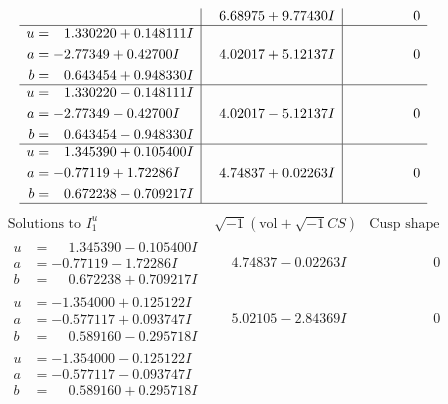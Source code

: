 \documentclass[1p]{elsarticle_modified}
\theoremstyle{definition}
\newcommand{\I}{\sqrt{-1}}
\begin{document}
$$\begin{array}{c|c|c}
 & \phantom{-}6.68975 + 9.77430 I & \phantom{-0.000000 } 0 \\ \hline\begin{aligned}
u &= \phantom{-}1.330220 + 0.148111 I \\
a &= -2.77349 + 0.42700 I \\
b &= \phantom{-}0.643454 + 0.948330 I\end{aligned}
 & \phantom{-}4.02017 + 5.12137 I & \phantom{-0.000000 } 0 \\ \hline\begin{aligned}
u &= \phantom{-}1.330220 - 0.148111 I \\
a &= -2.77349 - 0.42700 I \\
b &= \phantom{-}0.643454 - 0.948330 I\end{aligned}
 & \phantom{-}4.02017 - 5.12137 I & \phantom{-0.000000 } 0 \\ \hline\begin{aligned}
u &= \phantom{-}1.345390 + 0.105400 I \\
a &= -0.77119 + 1.72286 I \\
b &= \phantom{-}0.672238 - 0.709217 I\end{aligned}
 & \phantom{-}4.74837 + 0.02263 I & \phantom{-0.000000 } 0\\
 \hline 
 \end{array}$$\newpage$$\begin{array}{c|c|c}  
\text{Solutions to }I^u_{1}& \I (\text{vol} + \sqrt{-1}CS) & \text{Cusp shape}\\
 \hline 
\begin{aligned}
u &= \phantom{-}1.345390 - 0.105400 I \\
a &= -0.77119 - 1.72286 I \\
b &= \phantom{-}0.672238 + 0.709217 I\end{aligned}
 & \phantom{-}4.74837 - 0.02263 I & \phantom{-0.000000 } 0 \\ \hline\begin{aligned}
u &= -1.354000 + 0.125122 I \\
a &= -0.577117 + 0.093747 I \\
b &= \phantom{-}0.589160 - 0.295718 I\end{aligned}
 & \phantom{-}5.02105 - 2.84369 I & \phantom{-0.000000 } 0 \\ \hline\begin{aligned}
u &= -1.354000 - 0.125122 I \\
a &= -0.577117 - 0.093747 I \\
b &= \phantom{-}0.589160 + 0.295718 I\end{aligned}

\end{array}$$
\end{document}
